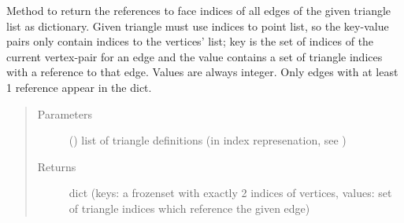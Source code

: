 \documentclass[letterpaper,10pt,english]{sphinxmanual}
\begin{document}
\begin{fulllineitems}
\label{\detokenize{pk_src.misc:pk_src.misc.getTriangleEdgesReferences}}
Method to return the references to face indices of all  edges of the given triangle list as dictionary. Given triangle must use indices to point list, so the key-value pairs only contain indices to the vertices’ list; key is the set of indices of the current vertex-pair for an edge and the value contains a set of triangle indices with a reference to that edge. Values are always integer. Only edges with at least 1 reference appear in the dict.
\begin{quote}\begin{description}
\item[{Parameters}] \leavevmode
{} (\sphinxstyleliteralemphasis{{[}}\sphinxstyleliteralemphasis{{[}}\sphinxstyleliteralemphasis{, }\sphinxstyleliteralemphasis{, }\sphinxstyleliteralemphasis{{]}}\sphinxstyleliteralemphasis{, }\sphinxstyleliteralemphasis{{[}}\sphinxstyleliteralemphasis{, }\sphinxstyleliteralemphasis{, }\sphinxstyleliteralemphasis{{]}}\sphinxstyleliteralemphasis{, }\sphinxstyleliteralemphasis{{]}}) \textendash{} list of triangle definitions (in index represenation, see )

\item[{Returns}] \leavevmode
dict (keys: a frozenset with exactly 2 indices of vertices, values: set of triangle indices which reference the given edge)

\end{description}\end{quote}

\end{fulllineitems}

\end{document}
